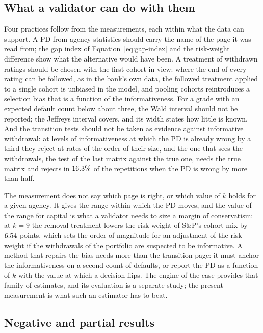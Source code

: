 \subsection{What a validator can do with them}
\label{sec:discussion-use}

Four practices follow from the measurements, each within what the data can support. A PD from agency statistics should carry the name of the page it was read from; the gap index of Equation~\eqref{eq:gap-index} and the risk-weight difference show what the alternative would have been. A treatment of withdrawn ratings should be chosen with the first cohort in view: where the end of every rating can be followed, as in the bank's own data, the followed treatment applied to a single cohort is unbiased in the model, and pooling cohorts reintroduces a selection bias that is a function of the informativeness. For a grade with an expected default count below about three, the Wald interval should not be reported; the Jeffreys interval covers, and its width states how little is known. And the transition tests should not be taken as evidence against informative withdrawal: at levels of informativeness at which the PD is already wrong by a third they reject at rates of the order of their size, and the one that sees the withdrawals, the test of the last matrix against the true one, needs the true matrix and rejects in $16.3\%$ of the repetitions when the PD is wrong by more than half. %

The measurement does not say which page is right, or which value of $k$ holds for a given agency. It gives the range within which the PD moves, and the value of the range for capital is what a validator needs to size a margin of conservatism: at $k=9$ the removal treatment lowers the risk weight of S\&P's cohort mix by $6.54$ points, which sets the order of magnitude for an adjustment of the risk weight if the withdrawals of the portfolio are suspected to be informative. A method that repairs the bias needs more than the transition page: it must anchor the informativeness on a second count of defaults, or report the PD as a function of $k$ with the value at which a decision flips. The engine of the case provides that family of estimates, and its evaluation is a separate study; the present measurement is what such an estimator has to beat.

\subsection{Negative and partial results}
\label{sec:discussion-negative}

